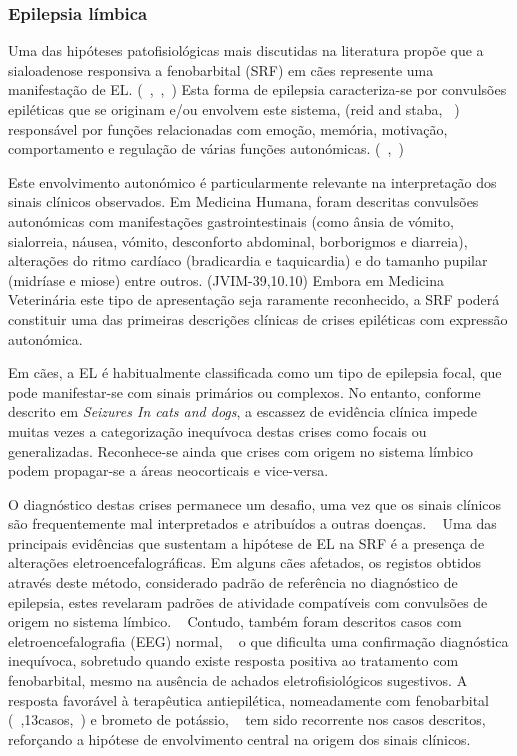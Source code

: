 \subsubsection{Epilepsia límbica}

Uma das hipóteses patofisiológicas mais discutidas na literatura propõe que a sialoadenose responsiva a fenobarbital (SRF) em cães represente uma manifestação de EL. (~\cite{Kalayanakoul2019},~\cite{gibbon_phenobarbital-responsive_german_2004},~\cite{gibbon_phenobarbital-responsive_german_2004}) Esta forma de epilepsia caracteriza-se por convulsões epiléticas que se originam e/ou envolvem este sistema, (reid and staba, ~\cite{gibbon_phenobarbital-responsive_german_2004}) responsável por funções relacionadas com emoção, memória, motivação, comportamento e regulação de várias funções autonómicas. (~\cite{gibbon_phenobarbital-responsive_german_2004},~\cite{Bandusena2022})


Este envolvimento autonómico é particularmente relevante na interpretação dos sinais clínicos observados. Em Medicina Humana, foram descritas convulsões autonómicas com manifestações gastrointestinais (como ânsia de vómito, sialorreia, náusea, vómito, desconforto abdominal, borborigmos e diarreia), alterações do ritmo cardíaco (bradicardia e taquicardia) e do tamanho pupilar (midríase e miose) entre outros. (JVIM-39,10.10) Embora em Medicina Veterinária este tipo de apresentação seja raramente reconhecido, a SRF poderá constituir uma das primeiras descrições clínicas de crises epiléticas com expressão autonómica. ~\cite{Diop2025}


Em cães, a EL é habitualmente classificada como um tipo de epilepsia focal, que pode manifestar-se com sinais primários ou complexos. No entanto, conforme descrito em \textit{Seizures In cats and dogs}, a escassez de evidência clínica impede muitas vezes a categorização inequívoca destas crises como focais ou generalizadas. Reconhece-se ainda que crises com origem no sistema límbico podem propagar-se a áreas neocorticais e vice-versa. 


O diagnóstico destas crises permanece um desafio, uma vez que os sinais clínicos são frequentemente mal interpretados e atribuídos a outras doenças. ~\cite{Diop2025}
Uma das principais evidências que sustentam a hipótese de EL na SRF é a presença de alterações eletroencefalográficas. Em alguns cães afetados, os registos obtidos através deste método, considerado padrão de referência no diagnóstico de epilepsia, estes revelaram padrões de atividade compatíveis com convulsões de origem no sistema límbico. ~\cite{gibbon_phenobarbital-responsive_german_2004} Contudo, também foram descritos casos com eletroencefalografia (EEG) normal, ~\cite{gibbon_phenobarbital-responsive_german_2004} o que dificulta uma confirmação diagnóstica inequívoca, sobretudo quando existe resposta positiva ao tratamento com fenobarbital, mesmo na ausência de achados eletrofisiológicos sugestivos.
A resposta favorável à terapêutica antiepilética, nomeadamente com fenobarbital (~\cite{Alcoverro2014},13casos,~\cite{gibbon_phenobarbital-responsive_german_2004}) e brometo de potássio, ~\cite{Alcoverro2014} tem sido recorrente nos casos descritos, reforçando a hipótese de envolvimento central na origem dos sinais clínicos.


